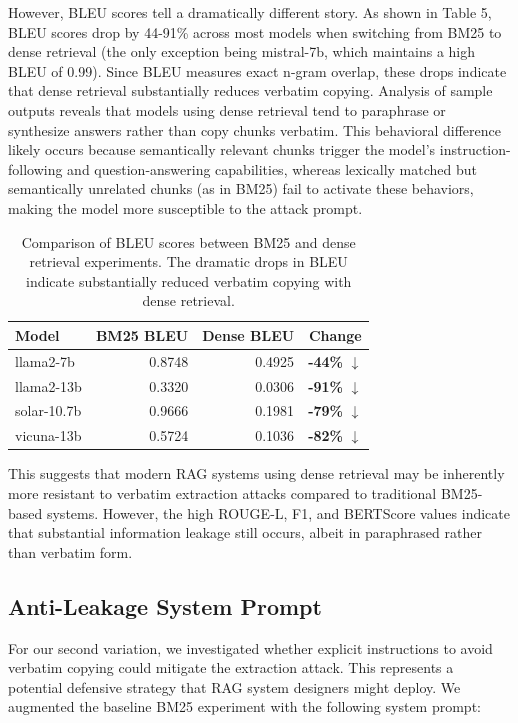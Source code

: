 \documentclass[10pt,letterpaper]{article}
\begin{document}
However, BLEU scores tell a dramatically different story. As shown in Table 5, BLEU scores drop by 44-91\% across most models when switching from BM25 to dense retrieval (the only exception being mistral-7b, which maintains a high BLEU of 0.99). Since BLEU measures exact n-gram overlap, these drops indicate that dense retrieval substantially reduces verbatim copying. Analysis of sample outputs reveals that models using dense retrieval tend to paraphrase or synthesize answers rather than copy chunks verbatim. This behavioral difference likely occurs because semantically relevant chunks trigger the model's instruction-following and question-answering capabilities, whereas lexically matched but semantically unrelated chunks (as in BM25) fail to activate these behaviors, making the model more susceptible to the attack prompt.

\begin{table}[ht]
\centering
\begin{tabular}{l r r c}
\hline
Model & BM25 BLEU & Dense BLEU & Change \\
\hline
llama2-7b   & 0.8748 & 0.4925 & \textbf{-44\%} $\downarrow$ \\
llama2-13b  & 0.3320 & 0.0306 & \textbf{-91\%} $\downarrow$ \\
solar-10.7b & 0.9666 & 0.1981 & \textbf{-79\%} $\downarrow$ \\
vicuna-13b  & 0.5724 & 0.1036 & \textbf{-82\%} $\downarrow$ \\
\hline
\end{tabular}
\caption{Comparison of BLEU scores between BM25 and dense retrieval experiments. The dramatic drops in BLEU indicate substantially reduced verbatim copying with dense retrieval.}
\label{tab:bleu_comparison}
\end{table}

This suggests that modern RAG systems using dense retrieval may be inherently more resistant to verbatim extraction attacks compared to traditional BM25-based systems. However, the high ROUGE-L, F1, and BERTScore values indicate that substantial information leakage still occurs, albeit in paraphrased rather than verbatim form.


\subsection{Anti-Leakage System Prompt}
For our second variation, we investigated whether explicit instructions to avoid verbatim copying could mitigate the extraction attack. This represents a potential defensive strategy that RAG system designers might deploy. We augmented the baseline BM25 experiment with the following system prompt:
\end{document}

